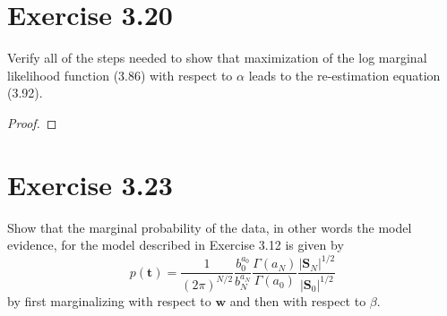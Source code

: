 \section*{Exercise 3.20}
Verify all of the steps needed to show that 
maximization of the log marginal likelihood function (3.86) with
respect to $\alpha$ leads to the re-estimation equation (3.92).

\vspace{1em}

\begin{proof}
    
\end{proof}

\section*{Exercise 3.23}
Show that the marginal probability of the data, in other words the model
evidence, for the model described in Exercise 3.12 is given by
\begin{equation}\label{eq:3.118}\tag{3.118}
    p(\mathbf{t}) = \frac{1}{(2\pi)^{N / 2}} \frac{b_0^{a_0}}{b_N^{a_N}}
    \frac{\Gamma(a_N)}{\Gamma(a_0)} \frac{|\mathbf{S}_N|^{1/2}}{|\mathbf{S}_0|^{1/2}}
\end{equation}
by first marginalizing with respect to $\mathbf{w}$ and then with
respect to $\beta$.

\vspace{1em}

